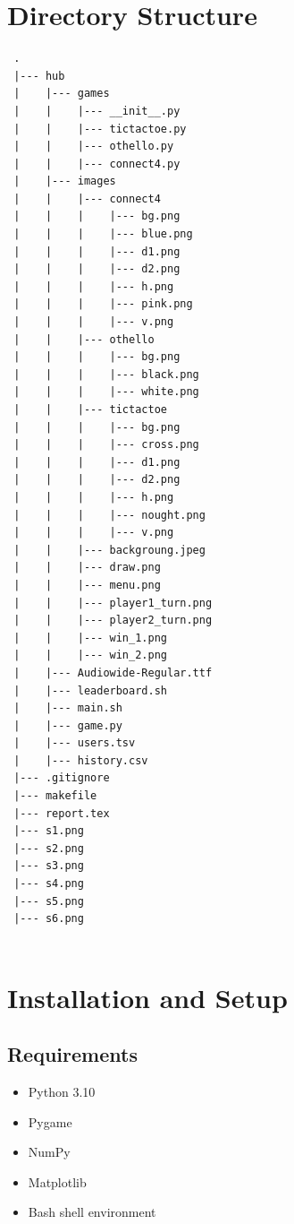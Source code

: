 \documentclass[12pt,a4paper]{article}
\begin{document}
\section{Directory Structure}

\begin{verbatim}
 .
 |--- hub
 |    |--- games
 |    |    |--- __init__.py
 |    |    |--- tictactoe.py
 |    |    |--- othello.py
 |    |    |--- connect4.py
 |    |--- images
 |    |    |--- connect4
 |    |    |    |--- bg.png
 |    |    |    |--- blue.png
 |    |    |    |--- d1.png
 |    |    |    |--- d2.png
 |    |    |    |--- h.png
 |    |    |    |--- pink.png
 |    |    |    |--- v.png
 |    |    |--- othello
 |    |    |    |--- bg.png
 |    |    |    |--- black.png
 |    |    |    |--- white.png
 |    |    |--- tictactoe
 |    |    |    |--- bg.png
 |    |    |    |--- cross.png
 |    |    |    |--- d1.png
 |    |    |    |--- d2.png
 |    |    |    |--- h.png
 |    |    |    |--- nought.png
 |    |    |    |--- v.png
 |    |    |--- backgroung.jpeg
 |    |    |--- draw.png
 |    |    |--- menu.png
 |    |    |--- player1_turn.png
 |    |    |--- player2_turn.png
 |    |    |--- win_1.png
 |    |    |--- win_2.png
 |    |--- Audiowide-Regular.ttf
 |    |--- leaderboard.sh
 |    |--- main.sh
 |    |--- game.py
 |    |--- users.tsv
 |    |--- history.csv
 |--- .gitignore
 |--- makefile
 |--- report.tex
 |--- s1.png
 |--- s2.png
 |--- s3.png
 |--- s4.png
 |--- s5.png
 |--- s6.png


 \end{verbatim}


\section{Installation and Setup}

\subsection{Requirements}

\begin{itemize}
    \item Python 3.10
    \item Pygame
    \item NumPy
    \item Matplotlib
    \item Bash shell environment
\end{itemize}
\end{document}
